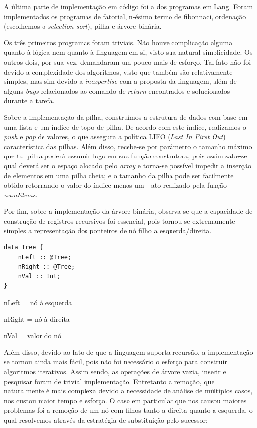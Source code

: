 \documentclass{article}
\begin{document}
A última parte de implementação em código foi a dos programas em Lang. Foram implementados os programas de fatorial, n-ésimo termo de fibonnaci, ordenação (escolhemos o \textit{selection sort}), pilha e árvore binária.

Os três primeiros programas foram triviais. Não houve complicação alguma quanto à lógica nem quanto à linguagem em si, visto sua natural simplicidade. Os outros dois, por sua vez, demandaram um pouco mais de esforço. Tal fato não foi devido a complexidade dos algoritmos, visto que também são relativamente simples, mas sim devido a \textit{inexpertise} com a proposta da linguagem, além de alguns \textit{bugs} relacionados ao comando de \textit{return} encontrados e solucionados durante a tarefa.

Sobre a implementação da pilha, construímos a estrutura de dados com base em uma lista e um índice de topo de pilha. De acordo com este índice, realizamos o \textit{push} e \textit{pop} de valores, o que assegura a política LIFO (\textit{Last In First Out}) característica das pilhas. Além disso, recebe-se por parâmetro o tamanho máximo que tal pilha poderá assumir logo em sua função construtora, pois assim sabe-se qual deverá ser o espaço alocado pelo \textit{array} e torna-se possível impedir a inserção de elementos em uma pilha cheia; e o tamanho da pilha pode ser facilmente obtido retornando o valor do índice menos um - ato realizado pela função \textit{numElems}.

Por fim, sobre a implementação da árvore binária, observa-se que a capacidade de construção de registros recursivos foi essencial, pois tornou-se extremamente simples a representação dos ponteiros de nó filho a esquerda/direita. 
\begin{center}
\begin{verbatim}
data Tree {
    nLeft :: @Tree;
    nRight :: @Tree;
    nVal :: Int;
}
\end{verbatim}  
nLeft = nó à esquerda

nRight = nó à direita

nVal = valor do nó
\end{center}

Além disso, devido ao fato de que a linguagem suporta recursão, a implementação se tornou ainda mais fácil, pois não foi necessário o esforço para construir algoritmos iterativos. Assim sendo, as operações de árvore vazia, inserir e pesquisar foram de trivial implementação. Entretanto a remoção, que naturalmente é mais complexa devido a necessidade de análise de múltiplos casos, nos custou maior tempo e esforço. O caso em particular que nos causou maiores problemas foi a remoção de um nó com filhos tanto a direita quanto à esquerda, o qual resolvemos através da estratégia de substituição pelo sucessor: 
\end{document}
